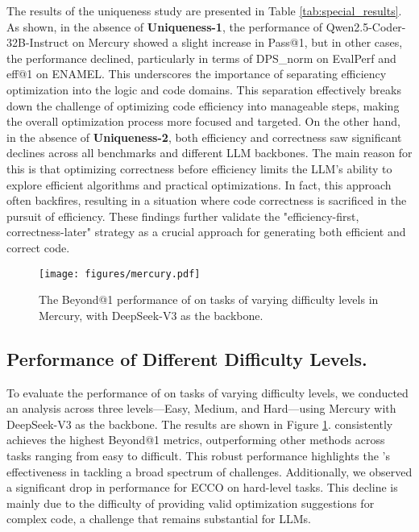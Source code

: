 The results of the uniqueness study are presented in Table \ref{tab:special_results}. As shown, in the absence of \textbf{Uniqueness-1}, the performance of Qwen2.5-Coder-32B-Instruct on Mercury showed a slight increase in Pass@1, but in other cases, the performance declined, particularly in terms of DPS\_norm on EvalPerf and eff@1 on ENAMEL. This underscores the importance of separating efficiency optimization into the logic and code domains. This separation effectively breaks down the challenge of optimizing code efficiency into manageable steps, making the overall optimization process more focused and targeted. On the other hand, in the absence of \textbf{Uniqueness-2}, both efficiency and correctness saw significant declines across all benchmarks and different LLM backbones. The main reason for this is that optimizing correctness before efficiency limits the LLM’s ability to explore efficient algorithms and practical optimizations. In fact, this approach often backfires, resulting in a situation where code correctness is sacrificed in the pursuit of efficiency. These findings further validate the "efficiency-first, correctness-later" strategy as a crucial approach for generating both efficient and correct code.

\begin{figure}
    \centering
    \texttt{[image: figures/mercury.pdf]}
    \caption{The Beyond@1 performance of \tool on tasks of varying difficulty levels in Mercury, with DeepSeek-V3 as the backbone.}
    \label{fig:Mercury}
\end{figure}

\subsection{Performance of Different Difficulty Levels.}
To evaluate the performance of \tool on tasks of varying difficulty levels, we conducted an analysis across three levels—Easy, Medium, and Hard—using Mercury with DeepSeek-V3 as the backbone. The results are shown in Figure \ref{fig:Mercury}. \tool consistently achieves the highest Beyond@1 metrics, outperforming other methods across tasks ranging from easy to difficult. This robust performance highlights the \tool’s effectiveness in tackling a broad spectrum of challenges. Additionally, we observed a significant drop in performance for ECCO on hard-level tasks. This decline is mainly due to the difficulty of providing valid optimization suggestions for complex code, a challenge that remains substantial for LLMs.


